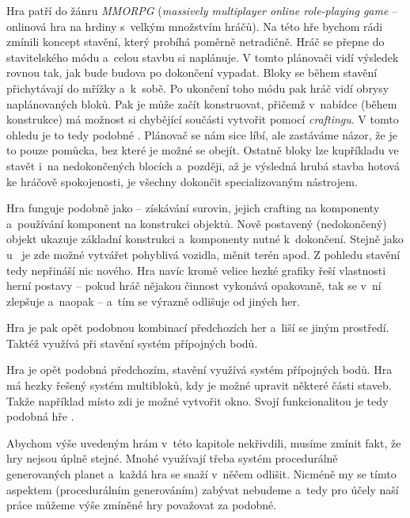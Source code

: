 Hra \NI{} patří do žánru \textit{MMORPG} (\textit{massively multiplayer online role-playing game} -- onlinová hra na hrdiny s~velkým množstvím hráčů). Na této hře bychom rádi zmínili koncept stavění, který probíhá poměrně netradičně. Hráč se přepne do stavitelského módu a~celou stavbu si naplánuje. V tomto plánovači vidí výsledek rovnou tak, jak bude budova po dokončení vypadat. Bloky se během stavění přichytávají do mřížky a~k~sobě. Po ukončení toho módu pak hráč vidí obrysy naplánovaných bloků. Pak je může začít konstruovat, přičemž v~nabídce (během konstrukce) má možnost si chybějící součásti vytvořit pomocí \textit{craftingu}. V tomto ohledu je to tedy podobné \SE{}. Plánovač se nám sice líbí, ale zastáváme názor, že je to pouze pomůcka, bez které je možné se obejít. Ostatně bloky lze kupříkladu ve \SE{} stavět i~na nedokončených blocích a~později, až je výsledná hrubá stavba hotová ke hráčově spokojenosti, je všechny dokončit specializovaným nástrojem.


Hra \PN{} funguje podobně jako \SE{} -- získávání surovin, jejich crafting na komponenty a~používání komponent na konstrukci objektů. Nově postavený (nedokončený) objekt ukazuje základní konstrukci a~komponenty nutné k~dokončení. Stejně jako u~\SE{} je zde možné vytvářet pohyblivá vozidla, měnit terén apod. Z pohledu stavění tedy nepřináší nic nového. Hra navíc kromě velice hezké grafiky řeší vlastnosti herní postavy -- pokud hráč nějakou činnost vykonává opakovaně, tak se v~ní zlepšuje a~naopak -- a~tím se výrazně odlišuje od jiných her.


Hra \ARK{} je pak opět podobnou kombinací předchozích her a~liší se jiným prostředí. Taktéž využívá při stavění systém přípojných bodů.

Hra \NMS{} je opět podobná předchozím, stavění využívá systém přípojných bodů. Hra má hezky řešený systém multibloků, kdy je možné upravit některé části staveb. Takže například místo zdi je možné vytvořit okno. Svojí funkcionalitou je tedy podobná hře \SE{}.

Abychom výše uvedeným hrám v~této kapitole nekřivdili, musíme zmínit fakt, že hry nejsou úplně stejné. Mnohé využívají třeba systém procedurálně generovaných planet a~každá hra se snaží v~něčem odlišit. Nicméně my se tímto aspektem (procedurálním generováním) zabývat nebudeme a~tedy pro účely naší práce můžeme výše zmíněné hry považovat za podobné.

